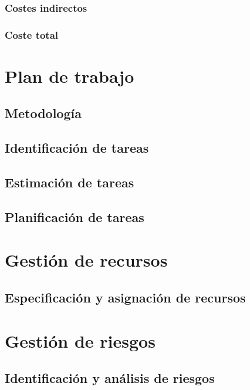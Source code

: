 \documentclass[12pt,a4paper,onecolumn,oneside]{report}
\begin{document}
\subsubsection{Costes indirectos}

\subsubsection{Coste total}

\section{Plan de trabajo}
\label{Plan de trabajo}

\subsection{Metodología}
\label{Metodología}

\subsection{Identificación de tareas}
\label{Identificación de tareas}

\subsection{Estimación de tareas}
\label{Estimación de tareas}

\subsection{Planificación de tareas}
\label{Planificación de tareas}

\section{Gestión de recursos}
\label{Gestión de recursos}

\subsection{Especificación y asignación de recursos}
\label{Especificación y asignación de recursos}

\section{Gestión de riesgos}
\label{sec:Gestión de riesgos}
\subsection{Identificación y análisis de riesgos}
\end{document}
